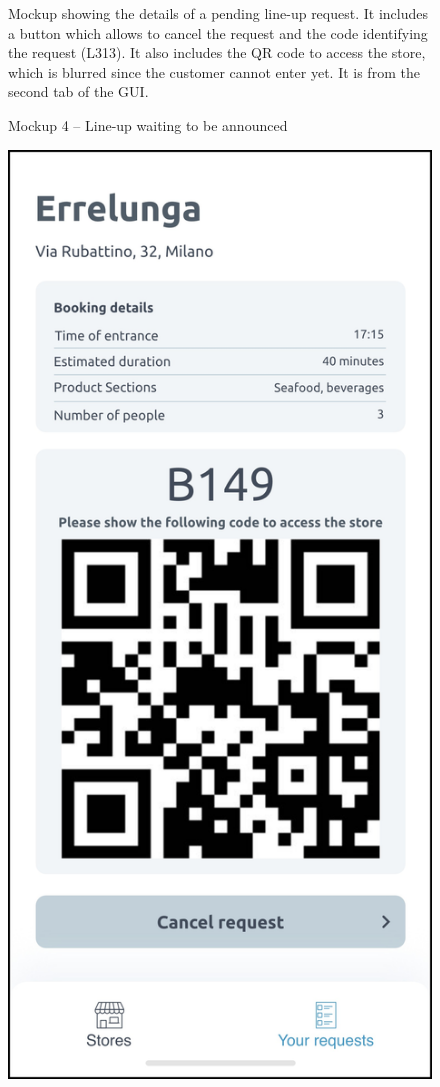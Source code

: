 \documentclass[a4paper,oneside,11pt]{book}
\newcommand{\captiondd}[2]{\caption{#1}\par\begin{center}\vspace{-.01\textheight}\small#2.\end{center}}
\begin{document}
\begin{multicols}{2}
\begin{figure}[H]
            \captiondd{Mockup 4 -- Line-up waiting to be announced}{Mockup showing the details of a pending line-up request. It includes a button which allows to cancel the request and the code identifying the request (L313). It also includes the QR code to access the store, which is blurred since the customer cannot enter yet. It is from the second tab of the GUI}
            \label{figure:mockup_4}
        \end{figure}
        \begin{figure}[H]
            \centering
            \includegraphics[width=\textwidth, height=.75\textheight, keepaspectratio]{pictures/mockups/ready_booking}

\end{figure}
\end{multicols}
\end{document}
